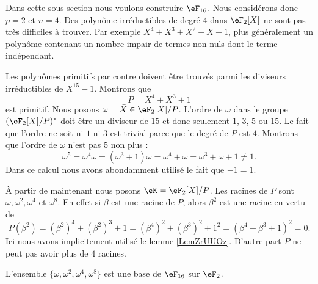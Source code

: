 Dans cette sous section nous voulons construire \( \eF_{16}\). Nous considérons donc \( p=2\) et \( n=4\). Des polynôme irréductibles de degré \( 4\) dans \( \eF_2[X]\) ne sont pas très difficiles à trouver. Par exemple \( X^4+X^3+X^2+X+1\), plus généralement un polynôme contenant un nombre impair de termes non nuls dont le terme indépendant.

Les polynômes primitifs par contre doivent être trouvés parmi les diviseurs irréductibles de \( X^{15}-1\). Montrons que
\begin{equation}
    P=X^4+X^3+1
\end{equation}
est primitif. Nous posons \( \omega=\bar X\in \eF_2[X]/P\). L'ordre de \( \omega\) dans le groupe \( (\eF_2[X]/P)^* \) doit être un diviseur de \( 15\) et donc seulement \( 1\), \( 3\), \( 5\) ou \( 15\). Le fait que l'ordre ne soit ni \( 1\) ni \( 3\) est trivial parce que le degré de \( P\) est \( 4\). Montrons que l'ordre de \( \omega\) n'est pas \( 5\) non plus :
\begin{equation}
    \omega^5=\omega^4\omega=(\omega^3+1)\omega=\omega^4+\omega=\omega^3+\omega+1\neq 1.
\end{equation}
Dans ce calcul nous avons abondamment utilisé le fait que \( -1=1\).

À partir de maintenant nous posons \( \eK=\eF_2[X]/P\). Les racines de \( P\) sont \( \omega,\omega^2,\omega^4\) et \( \omega^8\). En effet si \( \beta\) est une racine de \( P\), alors \( \beta^2\) est une racine en vertu de 
\begin{equation}
    P(\beta^2)=(\beta^2)^4+(\beta^2)^3+1=(\beta^4)^2+(\beta^3)^2+1^2=(\beta^4+\beta^3+1)^2=0.
\end{equation}
Ici nous avons implicitement utilisé le lemme \ref{LemZrUUOz}. D'autre part \( P\) ne peut pas avoir plus de \( 4\) racines.

\begin{proposition}
    L'ensemble \( \{ \omega,\omega^2,\omega^4,\omega^8 \}\) est une base de \( \eF_{16}\) sur \( \eF_2\).
\end{proposition}

